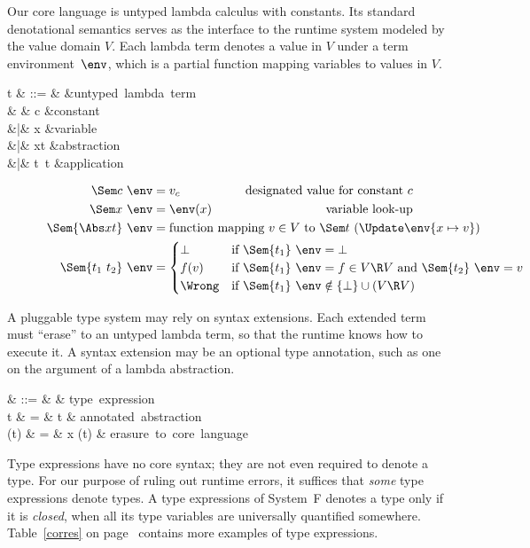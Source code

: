 \documentclass{amsart}
\begin{document}
Our core language is untyped lambda calculus with constants. Its
standard denotational semantics serves as the interface to the
runtime system modeled by the value domain $V$. Each lambda term
denotes a value in $V$ under a term environment~$\env$, which is
a partial function mapping variables to values in $V$.

\begin{syntax}
t & ::= & &\mbox{untyped lambda term} \\
& & c &\mbox{constant} \\
&|& x &\mbox{variable} \\
&|& \Abs xt &\mbox{abstraction} \\
&|& t~t &\mbox{application}
\end{syntax}
%
\begin{align*}
\Sem c~\env &= v_c & \mbox{designated value for constant }c\\
\Sem x~\env &= \env(x) & \mbox{variable look-up}\\
\Sem{\Abs x t}~\env &=
\rlap{function mapping $v\in V$ to $\Sem t~(\Update\env{x\mapsto v})$}\\
\Sem{t_1~t_2}~\env &=
\begin{cases}
\bot&\rlap{if $\Sem{t_1}~\env=\bot$}\\
f(v)&\rlap{if $\Sem{t_1}~\env=f\in V\R V$ and $\Sem{t_2}~\env=v$}\\
\Wrong&\rlap{if $\Sem{t_1}~\env\notin \{\bot\}\cup(V\R V)$}
\end{cases}
\end{align*}

A pluggable type system may rely on syntax extensions. Each
extended term must ``erase'' to an untyped lambda term, so that
the runtime knows how to execute it. A syntax extension may be an
optional type annotation, such as one on the argument of a lambda
abstraction.
\begin{syntax}
\sigma & ::= & \cdots & \mbox{type expression}\\
t & \+= & t & \mbox{annotated abstraction}\\
\Erase(t) & = & \Abs x \Erase(t) &
\mbox{erasure to core language}
\end{syntax}

Type expressions have no core syntax; they are not even required
to denote a type. For our purpose of ruling out runtime errors,
it suffices that \emph{some} type expressions denote types. A
type expressions of System~F denotes a type only if it is
\emph{closed}, when all its type variables are universally
quantified somewhere. Table~\ref{corres} on page~\pageref{corres}
contains more examples of type expressions.
\end{document}
